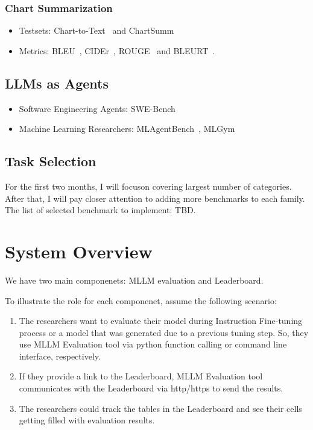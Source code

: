 \documentclass[
	letterpaper, %
]{jdf}
\begin{document}
\subsubsection{Chart Summarization}
\begin{itemize}
    \item Testsets: Chart-to-Text~\cite{kantharaj2022chart} and ChartSumm~\cite{rahman2023chartsumm}
    \item Metrics: BLEU~\cite{post2018call}, CIDEr~\cite{vedantam2015cider}, ROUGE~\cite{lin2004rouge} and BLEURT~\cite{sellam2020bleurt}.
              \end{itemize}
\subsection{LLMs as Agents}
\begin{itemize}
    \item Software Engineering Agents: SWE-Bench~\cite{yang2024swe}
    \item Machine Learning Researchers: MLAgentBench~\cite{huang2023mlagentbench}, MLGym~\cite{nathani2025mlgym}
              \end{itemize}
\subsection{Task Selection}\label{ssect:selected-tasks}
For the first two months, I will focuson covering largest number of categories.
After that, I will pay closer attention to adding more benchmarks to each family.
The list of selected benchmark to implement: TBD.

\section{System Overview}\label{sect:sys-overview}
We have two main componenets: MLLM evaluation and Leaderboard.

To illustrate the role for each componenet, assume the following scenario:
\begin{enumerate}
         \item The researchers want to evaluate their model during Instruction Fine-tuning process or a model that was generated due to a previous tuning step.
             So, they use MLLM Evaluation tool via python function calling or command line interface, respectively.
         \item If they provide a link to the Leaderboard, MLLM Evaluation tool communicates with the Leaderboard via http/https to send the results.
         \item The researchers could track the tables in the Leaderboard and see their cells getting filled with evaluation results.
              \end{enumerate}
\end{document}
